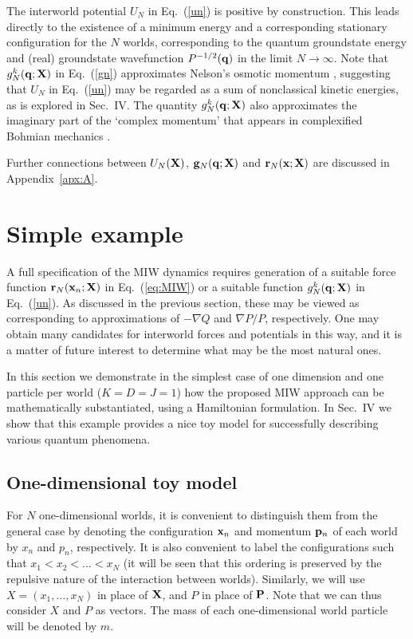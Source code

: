 \documentclass[12pt, aps,pra,amsmath,amssymb,superscriptaddress]{revtex4-2}
\renewcommand{\(}{\left(}
\renewcommand{\)}{\right)}
\newcommand{\blk}{\color{black}}
\newcommand{\blu}{\color{blue}}
\newcommand{\grn}{\color{ngreen}}
\renewcommand\grn{\blk}
\renewcommand\blu{\blk}
\begin{document}
The interworld potential $U_N$ in Eq.~(\ref{un}) is positive by construction.
This  leads directly to the existence of a minimum energy and a corresponding
stationary configuration for the $N$ worlds, corresponding to the quantum
groundstate energy and (real) groundstate wavefunction $P^{-1/2}({\bf q})$ \blk
in the limit $N\to\infty$.  Note that $g_N^k({\bf q} ;{\bf X})$ in
Eq.~(\ref{gn}) approximates Nelson's osmotic momentum \cite{nelson},  suggesting that $U_N$ in Eq.~(\ref{un})
may be regarded as a sum of nonclassical kinetic energies, as is  
explored in Sec.~IV. The quantity $g_N^k({\bf q} ;{\bf X})$  also approximates the imaginary part of the `complex momentum' that appears in complexified Bohmian mechanics \cite{john,wyatt}. 

Further \blk connections between $U_N({\bf X})$, ${\bf g}_N({\bf q}
;{\bf X})$ and ${\bf r}_N({\bf x};{\bf X})$ are discussed in
Appendix~\ref{apx:A}. 



\section{ Simple  example}\label{sec:example}
 
A full specification of the MIW dynamics requires generation of a suitable force
function ${\bf r}_N({\bf x}_n; {\bf X})$  in Eq.~(\ref{eq:MIW})  or a suitable
function $g_N^k({\bf q} ;{\bf X})$ in Eq.~(\ref{un}).  As discussed in the
previous section, these may be viewed as corresponding to approximations of
$-\nabla Q$ and $\nabla P/P$, respectively.
One may obtain many candidates for interworld forces and potentials in this way,
and it is a matter of future interest to determine what may be the most natural
ones.

\grn In this section we demonstrate in the simplest case of one dimension and one
particle per world ($K=D=J=1$) how the proposed MIW approach can be
mathematically substantiated, using a Hamiltonian formulation. \blk
 In
Sec.~IV we show that this example provides a nice toy model for successfully
describing various quantum phenomena.  


\subsection{One-dimensional toy model}

For $N$ one-dimensional worlds, it is convenient to distinguish them from the general case by denoting the configuration ${\bf x}_n$ and momentum ${\bf p}_n$ of each world by $x_n$ and $p_n$, respectively.  It is also convenient to label the configurations such that $x_1< x_2<\dots <x_N$ (it will be seen that this ordering is preserved by the repulsive nature of the interaction between worlds).  Similarly, we will use $X = (x_1, \ldots, x_N)$ in place of ${\bf X}$, 
and $P$ in place of ${\bf P}$. Note that we can thus consider $X$ and $P$ as vectors. \blu The mass of each one-dimensional world particle will be denoted by $m$. \blk 
\end{document}
